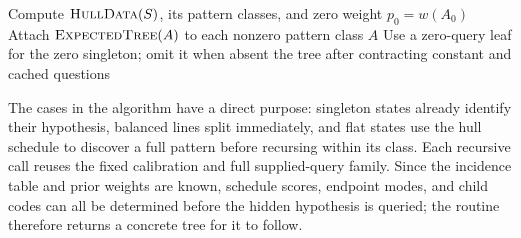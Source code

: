 ﻿\begin{algorithm}[H]
\caption{\ExpectedTree: the polynomial expected-depth algorithm}
\label{alg:expected-tree}
Compute $\textnormal{\textsc{HullData}}(S)$, its pattern classes, and zero weight $p_0=w(A_0)$\;
Attach $\textnormal{\textsc{ExpectedTree}}(A)$ to each nonzero pattern class $A$\;
Use a zero-query leaf for the zero singleton; omit it when absent\;
\KwRet the tree after contracting constant and cached questions\;
\end{algorithm}

The cases in the algorithm have a direct purpose: singleton states
already identify their hypothesis, balanced lines split immediately,
and flat states use the hull schedule to discover a full pattern before
recursing within its class. Each recursive call reuses the fixed
calibration and full supplied-query family. Since the incidence table
and prior weights are known, schedule scores, endpoint modes, and child
codes can all be determined before the hidden hypothesis is queried;
the routine therefore returns a concrete tree for it to follow.
